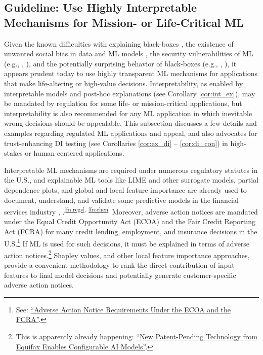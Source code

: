 \documentclass{article}
\begin{document}
\subsection{Guideline: Use Highly Interpretable Mechanisms for Mission- or Life-Critical ML} \label{sec:white_box}

Given the known difficulties with explaining black-boxes \cite{please_stop}, the existence of unwanted social bias in data and ML models \cite{fairmlbook}, the security vulnerabilities of ML (e.g., \citet{membership_inference}, \citet{model_stealing}), and the potentially surprising behavior of black-boxes (e.g., \citet{easily_fooled}, \citet{intriguing_properties}), it appears prudent today to use highly transparent ML mechanisms for  applications that make life-altering or high-value decisions. Interpretability, as enabled by interpretable models and post-hoc explanations (see Corollary \ref{cor:int_ex}), may be mandated by regulation for some life- or mission-critical applications, but interpretability is also recommended for any ML application in which inevitable wrong decisions should be appealable. This subsection discusses a few details and examples regarding regulated ML applications and appeal, and also advocates for trust-enhancing DI testing (see Corollaries \ref{cor:ex_di} -- \ref{cor:di_con}) in high-stakes or human-centered applications.

Interpretable ML mechanisms are required under numerous regulatory statutes in the U.S., and explainable ML tools like LIME and other surrogate models, partial dependence plots, and global and local feature importance are already used to document, understand, and validate some predictive models in the financial services industry \cite{lime-sup}, \cite{wf_xnn}.\textsuperscript{\ref{fn:regs}, \ref{fn:chen}} Moreover, adverse action notices are mandated under the Equal Credit Opportunity Act (ECOA) and the Fair Credit Reporting Act (FCRA) for many credit lending, employment, and insurance decisions in the U.S.\footnote{\scriptsize{See: \href{https://consumercomplianceoutlook.org/2013/second-quarter/adverse-action-notice-requirements-under-ecoa-fcra/}{``Adverse Action Notice Requirements Under the ECOA and the FCRA''}.}} If ML is used for such decisions, it must be explained in terms of adverse action notices.\footnote{\scriptsize{This is apparently already happening: \href{https://www.prnewswire.com/news-releases/new-patent-pending-technology-from-equifax-enables-configurable-ai-models-300701153.html}{``New Patent-Pending Technology from Equifax Enables Configurable AI Models''}.}} Shapley values, and other local feature importance approaches, provide a convenient methodology to rank the direct contribution of input features to final model decisions and potentially generate customer-specific adverse action notices.
\end{document}
